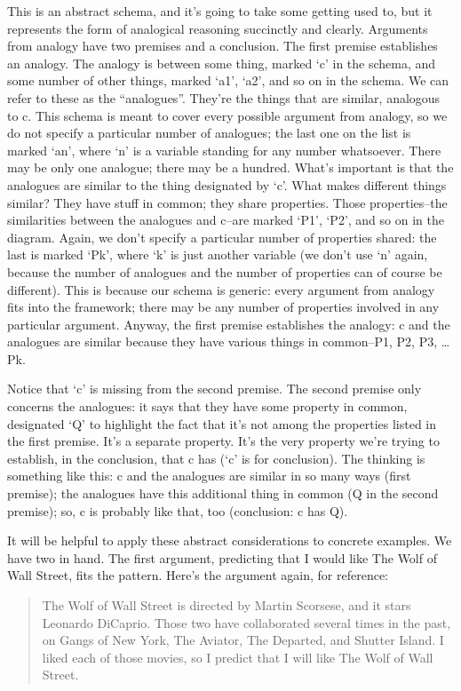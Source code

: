This is an abstract schema, and it's going to take some getting used to, but it represents the form
of analogical reasoning succinctly and clearly. Arguments from analogy have two premises and a
conclusion. The first premise establishes an analogy. The analogy is between some thing, marked
`c' in the schema, and some number of other things, marked `a1', `a2', and so on in the schema.
We can refer to these as the ``analogues''. They're the things that are similar, analogous to c. This
schema is meant to cover every possible argument from analogy, so we do not specify a particular
number of analogues; the last one on the list is marked `an', where `n' is a variable standing for
any number whatsoever. There may be only one analogue; there may be a hundred. What's
important is that the analogues are similar to the thing designated by `c'. What makes different
things similar? They have stuff in common; they share properties. Those properties--the
similarities between the analogues and c--are marked `P1', `P2', and so on in the diagram. Again,
we don't specify a particular number of properties shared: the last is marked `Pk', where `k' is just
another variable (we don't use `n' again, because the number of analogues and the number of
properties can of course be different). This is because our schema is generic: every argument from
analogy fits into the framework; there may be any number of properties involved in any particular
argument. Anyway, the first premise establishes the analogy: c and the analogues are similar
because they have various things in common--P1, P2, P3, \dots Pk.

Notice that `c' is missing from the second premise. The second premise only concerns the
analogues: it says that they have some property in common, designated `Q' to highlight the fact
that it's not among the properties listed in the first premise. It's a separate property. It's the very
property we're trying to establish, in the conclusion, that c has (`c' is for conclusion). The thinking
is something like this: c and the analogues are similar in so many ways (first premise); the
analogues have this additional thing in common (Q in the second premise); so, c is probably like
that, too (conclusion: c has Q).

It will be helpful to apply these abstract considerations to concrete examples. We have two in hand.
The first argument, predicting that I would like The Wolf of Wall Street, fits the pattern. Here's the
argument again, for reference:

\begin{quote}The Wolf of Wall Street is directed by Martin Scorsese, and it stars Leonardo DiCaprio.
Those two have collaborated several times in the past, on Gangs of New York, The Aviator,
The Departed, and Shutter Island. I liked each of those movies, so I predict that I will like
The Wolf of Wall Street.\end{quote}

